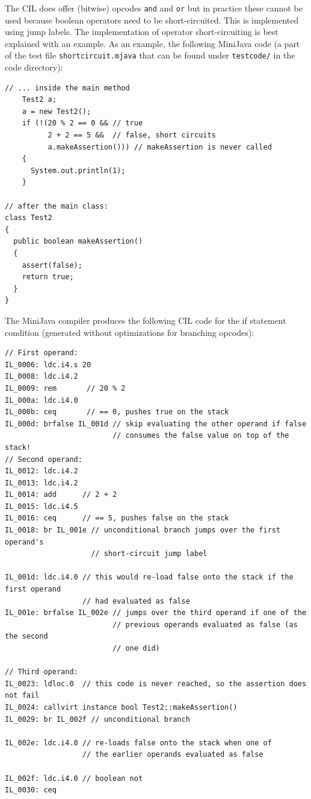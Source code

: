 \documentclass[a4paper,11pt]{article}
\begin{document}
The CIL does offer (bitwise) opcodes \verb,and, and \verb,or, but in practice these cannot be used because boolean operators need to be short-circuited. This is implemented using jump labels. The implementation of operator short-circuiting is best explained with an example. As an example, the following MiniJava code (a part of the test file \verb,shortcircuit.mjava, that can be found under \verb,testcode/, in the code directory):
\begin{verbatim}
// ... inside the main method
    Test2 a;
    a = new Test2();
    if (!(20 % 2 == 0 && // true
          2 + 2 == 5 &&  // false, short circuits
          a.makeAssertion())) // makeAssertion is never called
    {
      System.out.println(1);
    }

// after the main class:
class Test2
{
  public boolean makeAssertion()
  {
    assert(false);
    return true;
  }
}
\end{verbatim}

The MiniJava compiler produces the following CIL code for the if statement condition (generated without optimizations for branching opcodes):
\begin{verbatim}
// First operand:
IL_0006: ldc.i4.s 20
IL_0008: ldc.i4.2
IL_0009: rem       // 20 % 2
IL_000a: ldc.i4.0
IL_000b: ceq       // == 0, pushes true on the stack
IL_000d: brfalse IL_001d // skip evaluating the other operand if false
                         // consumes the false value on top of the stack!
// Second operand:
IL_0012: ldc.i4.2
IL_0013: ldc.i4.2
IL_0014: add      // 2 + 2
IL_0015: ldc.i4.5
IL_0016: ceq      // == 5, pushes false on the stack
IL_0018: br IL_001e // unconditional branch jumps over the first operand's
                    // short-circuit jump label

IL_001d: ldc.i4.0 // this would re-load false onto the stack if the first operand
                  // had evaluated as false
IL_001e: brfalse IL_002e // jumps over the third operand if one of the
                         // previous operands evaluated as false (as the second
                         // one did)

// Third operand:
IL_0023: ldloc.0  // this code is never reached, so the assertion does not fail
IL_0024: callvirt instance bool Test2::makeAssertion()
IL_0029: br IL_002f // unconditional branch

IL_002e: ldc.i4.0 // re-loads false onto the stack when one of
                  // the earlier operands evaluated as false

IL_002f: ldc.i4.0 // boolean not
IL_0030: ceq
\end{verbatim}
\end{document}

